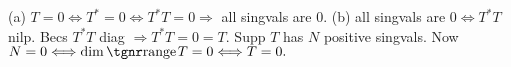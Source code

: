 %

\vfill{}

\vspace{6pt}


(a) $T=0\Longleftrightarrow T^*=0\Longleftrightarrow T^*T=0\Rightarrow$ all singvals are $0.$\parSol{}
(b) all singvals are $0\Longleftrightarrow T^*T$ nilp. Becs $T^*T$ diag $\Rightarrow T^*T=0=T.$\PfEnd\vspace{2pt}\parSol{}
\Or Supp $T$ has $N$ positive singvals. Now $N=0\Longleftrightarrow\dim\range T=0\Longleftrightarrow T=0.$\PfEnd
\SepLine

